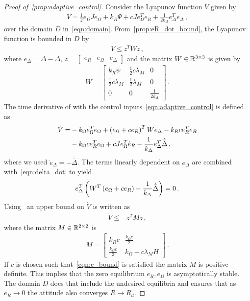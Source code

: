 \documentclass[letterpaper, 10 pt, conference]{ieeeconf}  %
\begin{document}
\begin{proof}[Proof of~\cref{prop:adaptive_control}]\label{proof:adaptive_control}
	Consider the Lyapunov function \( V \) given by
	\begin{gather}
		V = \frac{1}{2} e_\Omega J e_\Omega + k_R \Psi + c J e_\Omega^T e_R + \frac{1}{2 k_\Delta} e_\Delta^T e_\Delta \, , \label{eqn:v_adapt}
	\end{gather}
	over the domain \( D \) in~\cref{eqn:domain}.
	From~\cref{prop:eR_dot_bound}, the Lyapunov function is bounded in \( D \) by
	\begin{gather}
		V \leq z^T W z \, , \label{eqn:v_upper_bound}
	\end{gather}
	where \( e_\Delta = \Delta - \bar{\Delta} \), \( z = \begin{bmatrix}e_R & e_\Omega & e_\Delta\end{bmatrix} \) and the matrix \(W \in \mathbb{R}^{3 \times 3}\) is given by
	\begin{gather*}
		W = \begin{bmatrix}
			k_R \psi & \frac{1}{2} c \lambda_M & 0 \\
			\frac{1}{2} c \lambda_M & \frac{1}{2} \lambda_M & 0 \\
			0 & 0 & \frac{1}{2 k_\Delta}
		\end{bmatrix} \, .
	\end{gather*}
	The time derivative of with the control inputs~\cref{eqn:adaptive_control} is defined as
	\begin{align}
		\dot{V} =& - k_\Omega e_\Omega^T e_\Omega + \left( e_\Omega + c e_R \right)^T W e_\Delta - k_R c e_R^T e_R \nonumber\\
		&- k_\Omega c e_R^T e_\Omega + c J e_\Omega^T \dot{e}_R - \frac{1}{k_\Delta} e_\Delta^T \dot{\bar{\Delta}} \, , \label{eqn:vdot}
	\end{align}
	where we used \( \dot{e}_\Delta = - \dot{\bar{\Delta}} \).
	The terms linearly dependent on \( e_\Delta\) are combined with~\cref{eqn:delta_dot} to yield
	\begin{align*}
		 e_\Delta^T \left( W^T \left( e_\Omega + c e_R \right) - \frac{1}{k_\Delta} \dot{\bar{\Delta}} \right) = 0 \, . 
	\end{align*}
	Using~ an upper bound on \( \dot{V} \) is written as
	\begin{gather*}
		\dot{V} \leq -z^T M z \, ,
	\end{gather*}
	where the matrix \( M \in \mathbb{R}^{2 \times 2} \) is 
	\begin{gather}
		M = \begin{bmatrix}
			k_R c & \frac{k_\Omega c}{2} \\
			\frac{k_\Omega c}{2} & k_\Omega - c \lambda_M H
		\end{bmatrix} \, .
	\end{gather}
	If \( c \) is chosen such that~\cref{eqn:c_bound} is satisfied the matrix \( M \) is positive definite.
	This implies that the zero equilibrium \( e_R, e_\Omega\) is asymptotically stable. 
	The domain \( D \) does that include the undesired equilibria and ensures that as \( e_R \to 0 \) the attitude also converges \( R \to R_d \).
\end{proof}
\end{document}
